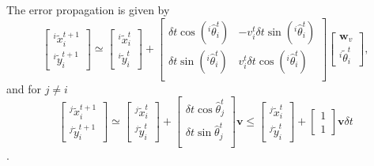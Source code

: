 \documentclass[xcolor=x11names]{article}
\begin{document}
   The error propagation is given by
   \begin{equation}
      \begin{bmatrix} 
         ^i\tilde{x}_i^{t+1} \\  {}^i\tilde{y}_i^{t+1}
      \end{bmatrix}
      \simeq
      \begin{bmatrix} 
         ^i\tilde{x}^{t}_{i} \\  ^i\tilde{y}^{t}_{i} 
      \end{bmatrix} +
      \begin{bmatrix} 
         \delta t \cos(^i\hat{\theta}^{t}_{i}) &  -v^t_{i}  \delta t \sin(^i\hat{\theta}^{t}_{i})  \\
         \delta t \sin(^i\hat{\theta}^{t}_{i}) &  v^t_{i}  \delta t \cos(^i\hat{\theta}^{t}_{i}) \\
      \end{bmatrix}
      \begin{bmatrix} 
         \mathbf{w}_v \\  ^i\tilde{\theta}^{t}_{i} 
      \end{bmatrix},
   \end{equation}    
and for $j \neq i$
   \begin{equation}
      \begin{bmatrix} 
         ^j\tilde{x}_i^{t+1} \\  {}^j\tilde{y}_i^{t+1}
      \end{bmatrix}
      \simeq
      \begin{bmatrix} 
         ^j\tilde{x}^{t}_{i} \\  ^j\tilde{y}^{t}_{i} 
      \end{bmatrix} +
      \begin{bmatrix} 
         \delta t \cos\hat{\theta}^{t}_{j} \\
         \delta t \sin\hat{\theta}^{t}_{j} \\
      \end{bmatrix} \mathbf{v}
      \leq 
      \begin{bmatrix} 
         ^j\tilde{x}^{t}_{i} \\  ^j\tilde{y}^{t}_{i} 
      \end{bmatrix} +
      \begin{bmatrix} 
         1 \\ 1
      \end{bmatrix} \mathbf{v} \delta t 
   \end{equation}.
\end{document}
